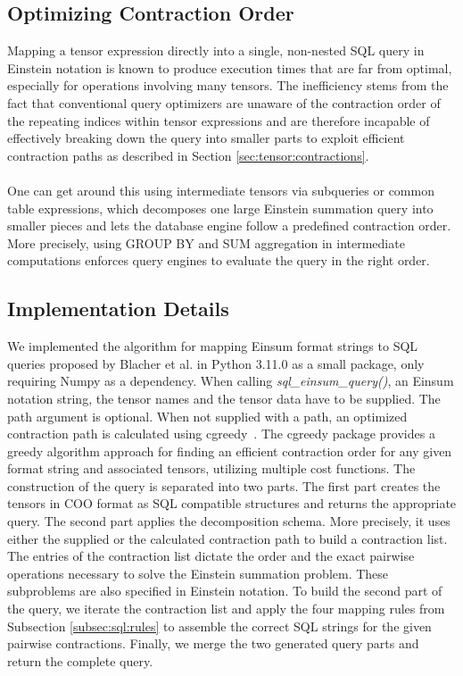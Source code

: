 \subsection{Optimizing Contraction Order}
Mapping a tensor expression directly into a single, non-nested SQL query in Einstein
notation is known to produce execution times that are far from optimal, especially for operations
involving many tensors. The inefficiency stems from the fact that conventional query optimizers
are unaware of the contraction order of the repeating indices within tensor expressions and are
therefore incapable of effectively breaking down the query into smaller parts to exploit efficient
contraction paths as described in Section \ref{sec:tensor:contractions}.
\\
\\
One can get around this using intermediate tensors via subqueries or common table expressions,
which decomposes one large Einstein summation query into smaller pieces and lets the database
engine follow a predefined contraction order. More precisely, using GROUP BY and SUM
aggregation in intermediate computations enforces query engines to evaluate the query in the
right order.

\subsection{Implementation Details}
We implemented the algorithm for mapping Einsum format strings to SQL queries proposed by Blacher
et al. in Python 3.11.0 as a small package, only requiring Numpy as a dependency. When
calling \textit{sql\_einsum\_query()}, an Einsum notation string, the tensor names and the tensor
data have to be supplied. The path argument is optional. When not supplied with a path, an
optimized contraction path is calculated using cgreedy~\cite{cgreedy}. The cgreedy package
provides a greedy algorithm approach for finding an efficient contraction order for any given
format string and associated tensors, utilizing multiple cost functions. The construction of the
query is separated into two parts. The first part creates the tensors in COO format as SQL
compatible structures and returns the appropriate query. The second part applies the decomposition
schema. More precisely, it uses either the supplied or the calculated contraction path to build a
contraction list. The entries of the contraction list dictate the order and the exact pairwise
operations necessary to solve the Einstein summation problem. These subproblems are also specified
in Einstein notation. To build the second part of the query, we iterate the contraction list and
apply the four mapping rules from Subsection \ref{subsec:sql:rules} to assemble the correct SQL
strings for the given pairwise contractions. Finally, we merge the two generated query parts and
return the complete query.

